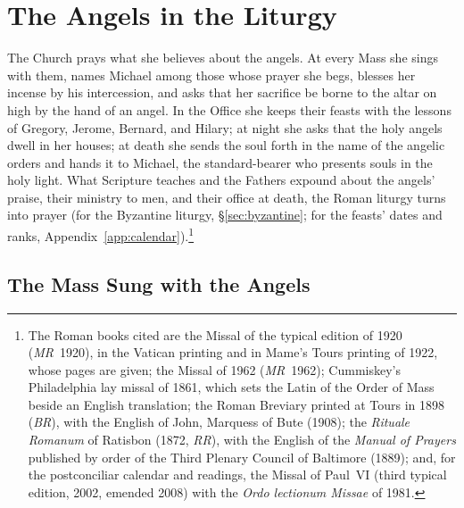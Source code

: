 \section{The Angels in the Liturgy}\label{sec:liturgy}

The Church prays what she believes about the angels. At every Mass she
sings with them, names Michael among those whose prayer she begs, blesses
her incense by his intercession, and asks that her sacrifice be borne to
the altar on high by the hand of an angel. In the Office she keeps their
feasts with the lessons of Gregory, Jerome, Bernard, and Hilary; at night
she asks that the holy angels dwell in her houses; at death she sends the
soul forth in the name of the angelic orders and hands it to Michael, the
standard-bearer who presents souls in the holy light. What Scripture
teaches and the Fathers expound about the angels' praise, their ministry
to men, and their office at death, the Roman liturgy turns into
prayer (for the Byzantine liturgy, \S\ref{sec:byzantine}; for the feasts'
dates and ranks, Appendix~\ref{app:calendar}).\footnote{The Roman books cited are the Missal of the typical
edition of 1920 (\emph{MR}~1920), in the Vatican printing and in Mame's
Tours printing  of 1922, whose pages are given; the
Missal of 1962 (\emph{MR}~1962); Cummiskey's Philadelphia lay missal of
1861, which sets the Latin of the Order of Mass beside an English
translation; the Roman Breviary printed at Tours in 1898 (\emph{BR}), with
the English of John, Marquess of Bute (1908); the \emph{Rituale Romanum}
of Ratisbon (1872, \emph{RR}), with the English of the \emph{Manual of
Prayers} published by order of the Third Plenary Council of Baltimore
(1889); and, for the postconciliar calendar and readings, the Missal of
Paul~VI (third typical edition, 2002, emended 2008) with the \emph{Ordo
lectionum Missae} of 1981.}

\sectionguard
\subsection{The Mass Sung with the Angels}

